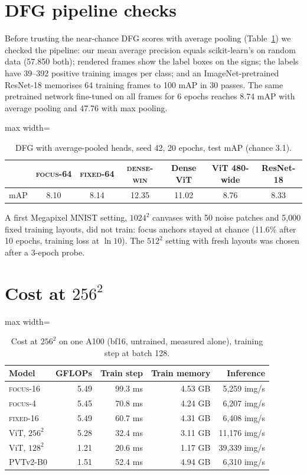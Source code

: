 \documentclass[runningheads]{llncs}
\newcommand{\focus}{\textsc{focus}}
\newcommand{\fixed}{\textsc{fixed}}
\newcommand{\densewin}{\textsc{dense-win}}
\begin{document}
\section{DFG pipeline checks}
\label{app:dfg}
Before trusting the near-chance DFG scores with average pooling (Table~\ref{tab:avgpool}) we
checked the pipeline: our mean average precision equals scikit-learn's on random data (57.850
both); rendered frames show the label boxes on the signs; the labels have 39--392 positive
training images per class; and an ImageNet-pretrained ResNet-18 memorises 64 training frames to
100 mAP in 30 passes. The same pretrained network fine-tuned on all frames for 6 epochs reaches
8.74 mAP with average pooling and 47.76 with max pooling.
\begin{table}[h]
\centering
\caption{DFG with average-pooled heads, seed 42, 20 epochs, test mAP (chance 3.1).}
\label{tab:avgpool}
\begin{adjustbox}{max width=\linewidth}
\begin{tabular}{lcccccc}
\toprule
& \focus-64 & \fixed-64 & \densewin & Dense ViT & ViT 480-wide & ResNet-18 \\
\midrule
mAP & 8.10 & 8.14 & 12.35 & 11.02 & 8.76 & 8.33 \\
\bottomrule
\end{tabular}
\end{adjustbox}
\end{table}
A first Megapixel MNIST setting, $1024^2$ canvases with 50 noise patches and 5{,}000 fixed
training layouts, did not train: focus anchors stayed at chance (11.6\% after 10 epochs, training
loss at $\ln 10$). The $512^2$ setting with fresh layouts was chosen after a 3-epoch probe.

\section{Cost at $256^2$}
\label{app:cost}
\begin{table}[h]
\centering
\caption{Cost at $256^2$ on one A100 (bf16, untrained, measured alone), training step at batch
128.}
\begin{adjustbox}{max width=\linewidth}
\begin{tabular}{lrrrr}
\toprule
Model & GFLOPs & Train step & Train memory & Inference \\
\midrule
\focus-16 & 5.49 & 99.3 ms & 4.53 GB & 5{,}259 img/s \\
\focus-4 & 5.45 & 70.8 ms & 4.24 GB & 6{,}207 img/s \\
\fixed-16 & 5.49 & 60.7 ms & 4.31 GB & 6{,}408 img/s \\
ViT, $256^2$ & 5.28 & 32.4 ms & 3.11 GB & 11{,}176 img/s \\
ViT, $128^2$ & 1.21 & 20.6 ms & 1.17 GB & 39{,}339 img/s \\
PVTv2-B0 & 1.51 & 52.4 ms & 4.94 GB & 6{,}310 img/s \\
\bottomrule
\end{tabular}
\end{adjustbox}
\end{table}
\end{document}
